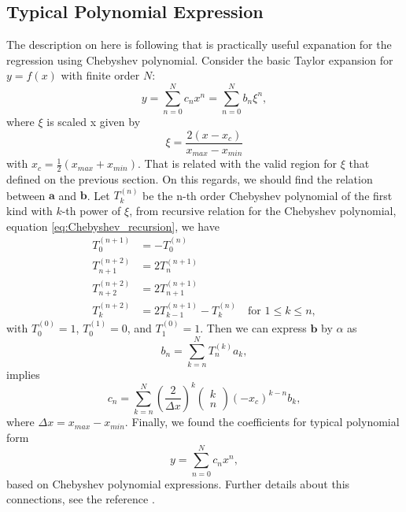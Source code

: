 \documentclass[10pt, a4paper]{report}
\begin{document}
\begin{appendices}
  \section{Typical Polynomial Expression}
  The description on here is following \textcite{SooCho:2013bg} that is practically useful expanation for the regression using Chebyshev polynomial.
  Consider the basic Taylor expansion for $y=f(x)$ with finite order $N$:
  \begin{equation}
    y = \sum_{n=0}^{N} c_n x^n = \sum_{n=0}^{N} b_n\xi^n,
  \end{equation}
  where $\xi$ is scaled x given by
  \begin{equation}
    \xi = \frac{2(x - x_c)}{x_{max} - x_{min}}
  \end{equation}
  with $x_c = \frac{1}{2}(x_{max} + x_{min})$. That is related with the valid region for $\xi$ that defined on the previous section. On this regards, we should find the relation between $\mathbf{a}$ and $\mathbf{b}$.
  Let $T^{(n)}_{k}$ be the n-th order Chebyshev polynomial of the first kind with $k$-th power of $\xi$, from recursive relation for the Chebyshev polynomial, equation \eqref{eq:Chebyshev_recursion}, we have
  \begin{align}
    T_0^{(n+1)} &= -T_0^{(n)} \\
    T_{n+1}^{(n+2)} &= 2T_{n}^{(n+1)} \\
    T_{n+2}^{(n+2)} &= 2T_{n+1}^{(n+1)} \\
    T_k^{(n+2)} &= 2T_{k-1}^{(n+1)}-T_k^{(n)}\quad\textrm{for }1\leq k\leq n,
  \end{align}
  with $T_0^{(0)}=1$, $T_0^{(1)}=0$, and $T_1^{(0)} = 1$. Then we can express $\mathbf{b}$ by $\alpha$ as
  \begin{equation}
    b_n = \sum_{k=n}^{N}T_n^{(k)}a_k,
  \end{equation}
  implies
  \begin{equation}
    c_n = \sum_{k=n}^{N}\left(\frac{2}{\Delta x}\right)^k\left(\begin{array}{c} k \\ n \end{array}\right)\left(-x_c\right)^{k-n}b_k,
  \end{equation}
  where $\Delta x = x_{max} - x_{min}$.
  Finally, we found the coefficients for typical polynomial form
  \begin{equation}
    y = \sum_{n=0}^{N}c_nx^n,
  \end{equation}
  based on Chebyshev polynomial expressions.
  Further details about this connections, see the reference \textcite{SooCho:2013bg}.


\end{appendices}
\end{document}
